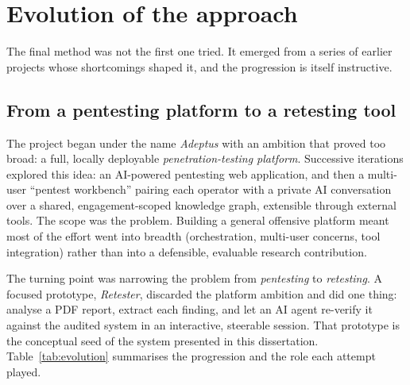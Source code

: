 \section{Evolution of the approach}
\label{sec:evolution}

The final method was not the first one tried. It emerged from a series of earlier
projects whose shortcomings shaped it, and the progression is itself instructive.

\subsection{From a pentesting platform to a retesting tool}
\label{subsec:prior-attempts}

The project began under the name \emph{Adeptus} with an ambition that proved too
broad: a full, locally deployable \emph{penetration-testing platform}. Successive
iterations explored this idea: an AI-powered pentesting web application, and then
a multi-user ``pentest workbench'' pairing each operator with a private AI
conversation over a shared, engagement-scoped knowledge graph, extensible through
external tools. The scope was the problem. Building a general offensive platform
meant most of the effort went into breadth (orchestration, multi-user concerns, tool
integration) rather than into a defensible, evaluable research
contribution.

The turning point was narrowing the problem from \emph{pentesting} to
\emph{retesting}. A focused prototype, \emph{Retester}, discarded the platform
ambition and did one thing: analyse a PDF report, extract each finding, and let an
AI agent re-verify it against the audited system in an interactive, steerable
session. That prototype is the conceptual seed of the system presented in this
dissertation. Table~\ref{tab:evolution} summarises the progression and the role each
attempt played.

